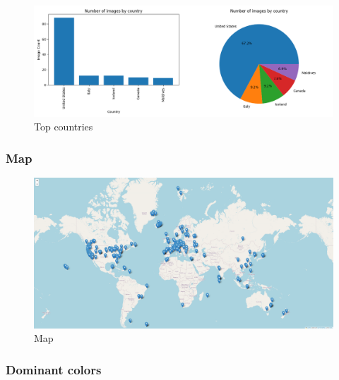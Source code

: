 \documentclass{article}
\begin{document}
    \begin{figure}[htbp]
        \centering
        \includegraphics[width=1.1 \textwidth]{img/country}
        \caption{Top countries}
        \label{fig:top_countries}
    \end{figure}

    \subsubsection{Map}\label{subsubsec:map}

    \begin{figure}[htbp]
        \centering
        \includegraphics[width=1.1 \textwidth]{img/map}
        \caption{Map}
        \label{fig:map}
    \end{figure}

    \newpage

    \subsubsection{Dominant colors}\label{subsubsec:dominant_colors}
\end{document}
